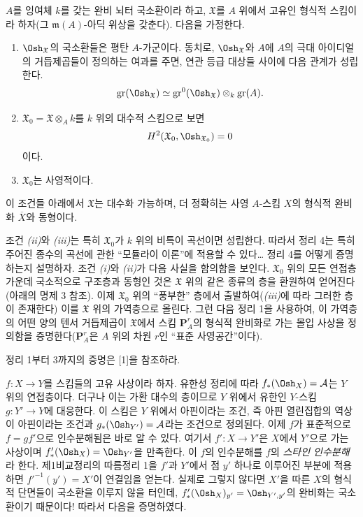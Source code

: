  $A$를 잉여체 $k$를 갖는 완비 뇌터 국소환이라 하고,
$\mathfrak X$를 $A$ 위에서 고유인 형식적 스킴이라 하자(그
$\mathfrak m(A)$-아딕 위상을 갖춘다). 다음을 가정한다.
\begin{enumerate}
  \item[\textit{i.}] $\Osh_{\mathfrak X}$의 국소환들은 평탄
    $A$-가군이다. 동치로, $\Osh_{\mathfrak X}$와 $A$에 $A$의 극대
    아이디얼의 거듭제곱들이 정의하는 여과를 주면, 연관 등급 대상들 사이에
    다음 관계가 성립한다.
    \[
      \operatorname{gr}(\Osh_{\mathfrak X})
      \simeq
      \operatorname{gr}^{0}(\Osh_{\mathfrak X})
      \otimes_k\operatorname{gr}(A).
    \]
  \item[\textit{ii.}]
    $\mathfrak X_0=\mathfrak X\otimes_A k$를 $k$ 위의 대수적 스킴으로 보면
    \[
      H^2(\mathfrak X_0,\Osh_{\mathfrak X_0})=0
    \]
    이다.
  \item[\textit{iii.}] $\mathfrak X_0$는 사영적이다.
\end{enumerate}
이 조건들 아래에서 $\mathfrak X$는 대수화 가능하며, 더 정확히는 사영
$A$-스킴 $X$의 형식적 완비화 $\overline X$와 동형이다.

조건 \textit{(ii)}와 \textit{(iii)}는 특히 $\mathfrak X_0$가 $k$ 위의
비특이 곡선이면 성립한다. 따라서 정리 4는 특히 주어진 종수의 곡선에 관한
``모듈라이 이론''에 적용할 수 있다\ldots{} 정리 4를 어떻게 증명하는지
설명하자. 조건 \textit{(i)}와 \textit{(ii)}가 다음 사실을 함의함을
보인다. $\mathfrak X_0$ 위의 모든 연접층 가운데 국소적으로 구조층과
동형인 것은 $\mathfrak X$ 위의 같은 종류의 층을 환원하여 얻어진다
(아래의 명제 3 참조).
이제 $\mathfrak X_0$ 위의 ``풍부한'' 층에서 출발하여(\textit{(iii)}에
따라 그러한 층이 존재한다) 이를 $\mathfrak X$ 위의 가역층으로 올린다.
그런 다음 정리 1을 사용하여, 이 가역층의 어떤 양의 텐서 거듭제곱이
$\mathfrak X$에서 스킴 $\mathbf P_A^r$의 형식적 완비화로 가는 몰입
사상을 정의함을 증명한다($\mathbf P_A^r$은 $A$ 위의 차원 $r$인
``표준 사영공간''이다).

정리 1부터 3까지의 증명은 [1]을 참조하라.


$f:X\longrightarrow Y$를 스킴들의 고유 사상이라 하자. 유한성 정리에 따라
$f_*(\Osh_X)=\mathcal A$는 $Y$ 위의 연접층이다. 더구나 이는 가환 대수의
층이므로 $Y$ 위에서 유한인 $Y$-스킴 $g:Y'\longrightarrow Y$에 대응한다.
이 스킴은 $Y$ 위에서 아핀이라는 조건, 즉 아핀 열린집합의 역상이 아핀이라는
조건과 $g_*(\Osh_{Y'})=\mathcal A$라는 조건으로 정의된다. 이제 $f$가
표준적으로 $f=gf'$으로 인수분해됨은 바로 알 수 있다. 여기서
$f':X\longrightarrow Y'$은 $X$에서 $Y'$으로 가는 사상이며
$f'_*(\Osh_X)=\Osh_{Y'}$을 만족한다. 이 $f$의 인수분해를 $f$의
\emph{스타인 인수분해}라 한다. 제1비교정리의 따름정리 1을 $f'$과
$Y'$에서 점 $y'$ 하나로 이루어진 부분에 적용하면
$f'^{-1}(y')=X'$이 연결임을 얻는다. 실제로 그렇지 않다면 $X'$을 따른
$X$의 형식적 단면들이 국소환을 이루지 않을 터인데,
$f'_*(\Osh_X)_{y'}=\Osh_{Y',y'}$의 완비화는 국소환이기 때문이다! 따라서
다음을 증명하였다.

